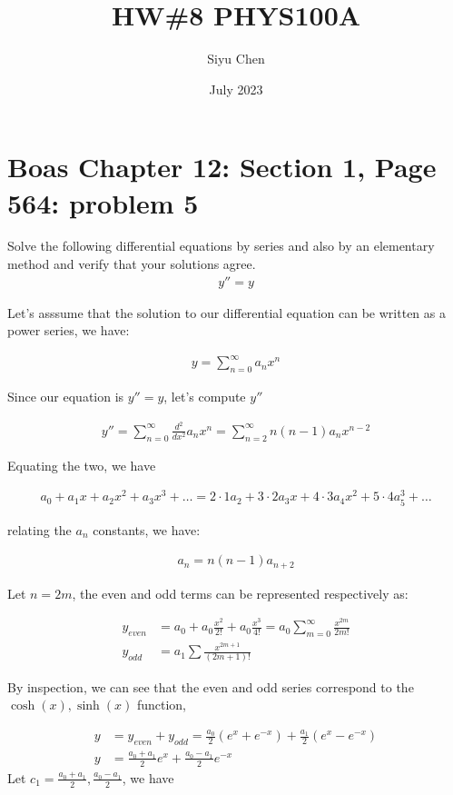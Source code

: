 \documentclass{article}
\title{HW\#8 PHYS100A}
\author{Siyu Chen}
\date{July 2023}
\numberwithin{equation}{section}
\begin{document}
\maketitle

\section{Boas Chapter 12: Section 1, Page 564: problem 5}
Solve the following differential equations by series and also by an elementary method and verify that your solutions agree. \begin{align*}
    y'' = y \end{align*}

Let's asssume that the solution to our differential equation can be written as a power series, we have:

\begin{align}
    y = \sum_{n=0}^{\infty} a_n x^n
\end{align}

Since our equation is $y'' = y$, let's compute $y''$

\begin{align}
    y'' = \sum_{n=0}^{\infty} \frac{d^2}{dx^2} a_n x^n = \sum_{n=2}^{\infty}n(n-1)a_n x^{n-2}
\end{align}

Equating the two, we have 

\begin{align}
    a_0 + a_1 x + a_2 x^2 + a_3 x^3 + \ldots = 2 \cdot 1 a_2 + 3 \cdot 2 a_3 x + 4 \cdot 3 a_4 x^2 + 5 \cdot 4 a_5^3 + \ldots
\end{align}

relating the $a_n$ constants, we have:

\begin{align}
    a_n = n(n-1) a_{n+2} 
\end{align}

Let $n=2m$, the even and odd terms can be represented respectively as: 

\begin{align}
    y_{even} &= a_0 + a_0\frac{x^2}{2!} + a_0  \frac{x^3}{4!} = a_0 \sum_{m=0}^{\infty} \frac{x^{2m}}{2m!} \\
    y_{odd}  &= a_1 \sum \frac{x^{2m+1}}{(2m+1)!}
\end{align}

By inspection, we can see that the even and odd series correspond to the $\cosh(x), \sinh(x)$ function, 

\begin{align}
    y &= y_{even} + y_{odd} = \frac{a_0}{2} (e^x + e^{-x}) + \frac{a_1}{2} (e^x - e^{-x}) \\
    y &= \frac{a_0 + a_1}{2} e^x + \frac{a_0- a_1}{2} e^{-x}
\end{align}
Let $c_1 = \frac{a_0 + a_1}{2}, \frac{a_0- a_1}{2}$, we have 
\end{document}
